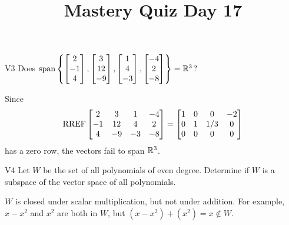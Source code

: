 \documentclass{sbgLAquiz}
\title{Mastery Quiz Day 17 }
\begin{document}
\begin{problem}{V3}
Does
\(
  \operatorname{span}\left\{
    \begin{bmatrix} 2 \\ -1 \\ 4 \end{bmatrix},
    \begin{bmatrix} 3 \\ 12 \\ -9 \end{bmatrix},
    \begin{bmatrix} 1 \\ 4 \\ -3 \end{bmatrix},
    \begin{bmatrix} -4 \\ 2 \\ -8 \end{bmatrix}
  \right\} = \mathbb{R}^3
\)?
\end{problem}
\begin{solution}
Since
\[
  \operatorname{RREF}\begin{bmatrix}
    2 & 3 & 1 & -4 \\
    -1 & 12 & 4 & 2 \\
    4 & -9 & -3 & -8
  \end{bmatrix} =
  \begin{bmatrix}
    1 & 0 & 0 & -2 \\
    0 & 1 & 1/3 & 0 \\
    0 & 0 & 0 & 0
  \end{bmatrix}
\]
has a zero row, the vectors fail to span \(\mathbb{R}^3\).
\end{solution}

\begin{problem}{V4} Let $W$ be the set of all polynomials of even degree.  Determine if $W$ is a subspace of the vector space of all polynomials.
\end{problem}
\begin{solution}
$W$ is closed under scalar multiplication, but not under addition.  For example, $x-x^2$ and $x^2$ are both in $W$, but $(x-x^2)+(x^2)=x \notin W$.
\end{solution}
\end{document}
